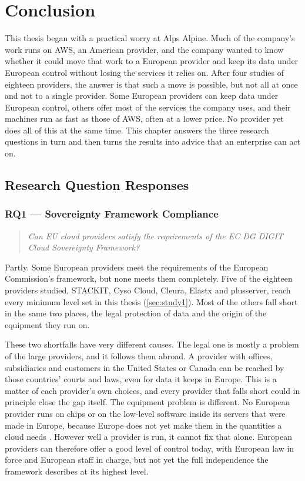 \chapter{Conclusion}
\label{ch:conclusion}

This thesis began with a practical worry at Alps Alpine. Much of the company's
work runs on \acs{AWS}, an American provider, and the company wanted to know
whether it could move that work to a European provider and keep its data under
European control without losing the services it relies on. After four studies of
eighteen providers, the answer is that such a move is possible, but not all at once
and not to a single provider. Some European providers can keep data under European control, others
offer most of the services the company uses, and their machines run as fast as
those of \acs{AWS}, often at a lower price. No provider yet does all of this at the
same time. This chapter answers the three research questions in turn and then turns
the results into advice that an enterprise can act on.

\section{Research Question Responses}
\label{sec:rq-responses}

\subsection{RQ1 --- Sovereignty Framework Compliance}
\label{subsec:rq1}

\begin{quote}
  \itshape Can EU cloud providers satisfy the requirements of the EC DG DIGIT
  Cloud Sovereignty Framework?
\end{quote}

Partly. Some European providers meet the requirements of the European
Commission's framework, but none meets them completely. Five of the eighteen
providers studied, STACKIT, Cyso Cloud, Cleura, Elastx and plusserver, reach every
minimum level set in this thesis (\cref{sec:study1}). Most of the others fall
short in the same two places, the legal protection of data and the origin of the
equipment they run on.

These two shortfalls have very different causes. The legal one is mostly a
problem of the large providers, and it follows them abroad. A provider with
offices, subsidiaries and customers in the United States or Canada can be reached
by those countries' courts and laws, even for data it keeps in Europe. This is a
matter of each provider's own choices, and every provider that falls short could
in principle close the gap itself. The equipment problem is different. No
European provider runs on chips or on the low-level software inside its servers
that were made in Europe, because Europe does not yet make them in the quantities a
cloud needs \cite{EU_ChipsAct_2023}. However well a provider is run, it cannot fix
that alone. European providers can therefore offer a good level of control today,
with European law in force and European staff in charge, but not yet the full
independence the framework describes at its highest level.

